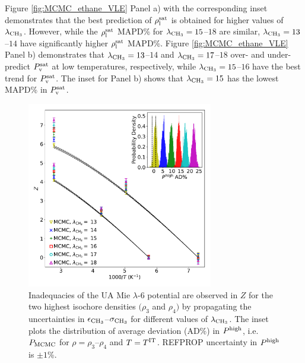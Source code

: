 \documentclass[preprint,letterpaper,floatfix,citeautoscript,aip,jcp]{revtex4-1}
\begin{document}
Figure \ref{fig:MCMC_ethane_VLE} Panel a) with the corresponding inset demonstrates that the best prediction of $\rho_{\rm l}^{\rm sat}$ is obtained for higher values of $\lambda_{\rm CH_3}$. However, while the $\rho_{\rm l}^{\rm sat}$ MAPD\% for $\lambda_{\rm CH_3} = 15$--$18$ are similar, $\lambda_{\rm CH_3} = 13$--$14$ have significantly higher $\rho_{\rm l}^{\rm sat}$ MAPD\%. Figure \ref{fig:MCMC_ethane_VLE} Panel b) demonstrates that $\lambda_{\rm CH_3} = 13$--$14$ and $\lambda_{\rm CH_3} = 17$--$18$ over- and under-predict $P_{\rm v}^{\rm sat}$ at low temperatures, respectively, 
while $\lambda_{\rm CH_3} = 15$--$16$ have the best trend for $P_{\rm v}^{\rm sat}$. The inset for Panel b) shows that $\lambda_{\rm CH_3} = 15$ has the lowest MAPD\% in $P_{\rm v}^{\rm sat}$.

\begin{figure}[htb!]
	\centering
	\includegraphics[width=3.2in]{MCMC_ethane_Phigh}
	\caption{Inadequacies of the UA Mie $\lambda$-6 potential are observed in $Z$ for the two highest isochore densities $(\rho_3$ and $\rho_4)$ by propagating the uncertainties in $\epsilon_{\rm CH_3}$--$\sigma_{\rm CH_3}$ for different values of $\lambda_{\rm CH_3}$. The inset plots the distribution of average deviation (AD\%) in $P^{\rm high}$, i.e. $P_{\rm MCMC}$ for $\rho = \rho_3$--$\rho_4$ and $T = T^{\rm IT}$. REFPROP uncertainty in $P^{\rm high}$ is $\pm 1$\%.}
	\label{fig:MCMC_ethane_Phigh}
\end{figure} 
\end{document}

